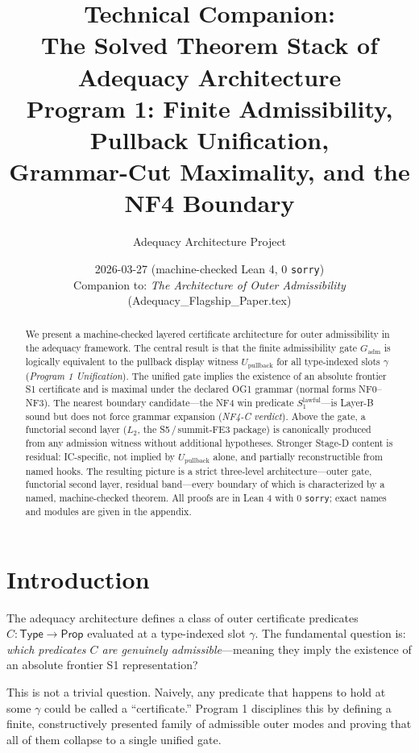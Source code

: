 \documentclass[11pt]{article}
\title{\textbf{Technical Companion:}\\The Solved Theorem Stack of Adequacy Architecture\\[4pt]
  \large Program 1: Finite Admissibility, Pullback Unification,\\
  Grammar-Cut Maximality, and the NF4 Boundary}
\author{Adequacy Architecture Project}
\date{2026-03-27 \quad (machine-checked Lean 4, 0 \texttt{sorry})\\[2pt]
  \small Companion to: \emph{The Architecture of Outer Admissibility} (Adequacy\_Flagship\_Paper.tex)}
\theoremstyle{plain}
\theoremstyle{definition}
\newcommand{\Gadm}{G_{\mathrm{adm}}}
\newcommand{\Upb}{U_{\mathrm{pullback}}}
\newcommand{\Stwo}{L_2}
\newcommand{\SoneLawful}{S_1^{\mathrm{lawful}}}
\begin{document}
\maketitle

\begin{abstract}
We present a machine-checked layered certificate architecture for outer
admissibility in the adequacy framework.  The central result is that the
finite admissibility gate $\Gadm$ is logically equivalent to the pullback
display witness $\Upb$ for all type-indexed slots $\gamma$
(\emph{Program 1 Unification}).  The unified gate implies the existence of
an absolute frontier S1 certificate and is maximal under the declared OG1
grammar (normal forms NF0--NF3).  The nearest boundary candidate---the NF4
win predicate $\SoneLawful$---is Layer-B sound but does not force grammar
expansion (\emph{NF4-C verdict}).  Above the gate, a functorial second layer
($\Stwo$, the S5\,/\,summit-FE3 package) is canonically produced from any
admission witness without additional hypotheses.  Stronger Stage-D content is
residual: IC-specific, not implied by $\Upb$ alone, and partially
reconstructible from named hooks.  The resulting picture is a strict
three-level architecture---outer gate, functorial second layer, residual
band---every boundary of which is characterized by a named, machine-checked
theorem.  All proofs are in Lean 4 with 0 \texttt{sorry}; exact names and
modules are given in the appendix.
\end{abstract}

\tableofcontents
\bigskip

\section{Introduction}
\label{sec:intro}

The adequacy architecture defines a class of outer certificate predicates
$C : \mathsf{Type} \to \mathsf{Prop}$ evaluated at a type-indexed slot
$\gamma$.  The fundamental question is: \emph{which predicates $C$ are
genuinely admissible}---meaning they imply the existence of an absolute
frontier S1 representation?

This is not a trivial question.  Naively, any predicate that happens to hold
at some $\gamma$ could be called a ``certificate.''  Program 1 disciplines
this by defining a finite, constructively presented family of admissible outer
modes and proving that all of them collapse to a single unified gate.
\end{document}
